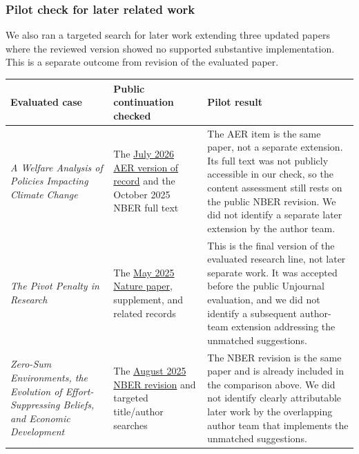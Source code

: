 \documentclass[
  11pt,
  letterpaper,
]{article}
\begin{document}
\subsubsection{Pilot check for later related
work}\label{pilot-check-for-later-related-work}

We also ran a targeted search for later work extending three updated
papers where the reviewed version showed no supported substantive
implementation. This is a separate outcome from revision of the
evaluated paper.

\begin{longtable}[]{@{}
  >{\raggedright\arraybackslash}p{}
  >{\raggedright\arraybackslash}p{}
  >{\raggedright\arraybackslash}p{}@{}}
\toprule\noalign{}
\begin{minipage}[b]{\linewidth}\raggedright
Evaluated case
\end{minipage} & \begin{minipage}[b]{\linewidth}\raggedright
Public continuation checked
\end{minipage} & \begin{minipage}[b]{\linewidth}\raggedright
Pilot result
\end{minipage} \\
\midrule\noalign{}
\endhead
\bottomrule\noalign{}
\endlastfoot
\emph{A Welfare Analysis of Policies Impacting Climate Change} & The
\href{https://www.aeaweb.org/articles?id=10.1257\%2Faer.20250166}{July
2026 AER version of record} and the October 2025 NBER full text & The
AER item is the same paper, not a separate extension. Its full text was
not publicly accessible in our check, so the content assessment still
rests on the public NBER revision. We did not identify a separate later
extension by the author team. \\
\emph{The Pivot Penalty in Research} & The
\href{https://www.nature.com/articles/s41586-025-09048-1}{May 2025
Nature paper}, supplement, and related records & This is the final
version of the evaluated research line, not later separate work. It was
accepted before the public Unjournal evaluation, and we did not identify
a subsequent author-team extension addressing the unmatched
suggestions. \\
\emph{Zero-Sum Environments, the Evolution of Effort-Suppressing
Beliefs, and Economic Development} & The
\href{https://www.nber.org/papers/w31663}{August 2025 NBER revision} and
targeted title/author searches & The NBER revision is the same paper and
is already included in the comparison above. We did not identify clearly
attributable later work by the overlapping author team that implements
the unmatched suggestions. \\
\end{longtable}
\end{document}

